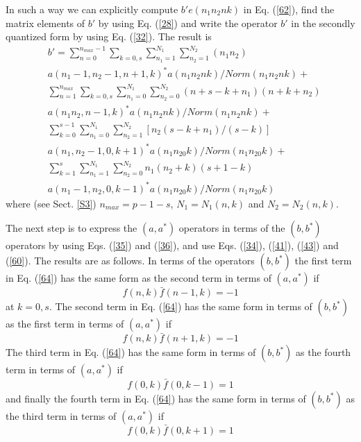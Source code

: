 \documentclass[a4paper,12pt]{article}%
\begin{document}
In such a way we can 
explicitly compute $b'e(n_1n_2nk)$ in Eq. (\ref{62}),
find the matrix elements of $b'$ by using Eq. (\ref{28})
and write the operator $b'$ in the secondly quantized form
by using Eq. (\ref{32}). The result is
\begin{eqnarray}
&b'=\sum_{n=0}^{n_{max}-1}\sum_{k=0,s}\sum_{n_1=1}^{N_1}
\sum_{n_2=1}^{N_2}(n_1n_2)\nonumber\\
&a(n_1-1,n_2-1,n+1,k)^*a(n_1n_2nk)/Norm(n_1n_2nk)+\nonumber\\
&\sum_{n=1}^{n_{max}}\sum_{k=0,s}\sum_{n_1=0}^{N_1}
\sum_{n_2=0}^{N_2}(n+s-k+n_1)(n+k+n_2)\nonumber\\
&a(n_1n_2,n-1,k)^*a(n_1n_2nk)/Norm(n_1n_2nk)+\nonumber\\
&\sum_{k=0}^{s-1}\sum_{n_1=0}^{N_1}
\sum_{n_2=1}^{N_2}[n_2(s-k+n_1)/(s-k)]\nonumber\\
&a(n_1,n_2-1,0,k+1)^*a(n_1n_20k)/Norm(n_1n_20k)+\nonumber\\
&\sum_{k=1}^{s}\sum_{n_1=1}^{N_1}
\sum_{n_2=0}^{N_2}n_1(n_2+k)(s+1-k)\nonumber\\
&a(n_1-1,n_2,0,k-1)^*a(n_1n_20k)/Norm(n_1n_20k)
\label{64}
\end{eqnarray}
where (see Sect. \ref{S3}) $n_{max}=p-1-s$, $N_1=N_1(n,k)$ 
and $N_2=N_2(n,k)$.

The next step is to express the $(a,a^*)$ operators in terms
of the $(b,b^*)$ operators by using Eqs. (\ref{35}) and 
(\ref{36}), and use Eqs. (\ref{34}), (\ref{41}), (\ref{43})
and (\ref{60}). The results are as follows. In terms of the
operators $(b,b^*)$ the first term in Eq. (\ref{64}) has the
same form as the second term in terms of $(a,a^*)$ if
\begin{equation}
f(n,k){\bar f}(n-1,k)=-1
\label{65}
\end{equation}
at $k=0,s$. The second term in Eq. (\ref{64}) has the same 
form in terms of $(b,b^*)$ as the first term in terms of 
$(a,a^*)$ if 
\begin{equation}
f(n,k){\bar f}(n+1,k)=-1
\label{66}
\end{equation}
The third term in Eq. (\ref{64}) has the same 
form in terms of $(b,b^*)$ as the fourth term in terms of 
$(a,a^*)$ if 
\begin{equation}
f(0,k){\bar f}(0,k-1)=1
\label{67}
\end{equation}
and finally the fourth term in Eq. (\ref{64}) has the same 
form in terms of $(b,b^*)$ as the third term in terms of 
$(a,a^*)$ if 
\begin{equation}
f(0,k){\bar f}(0,k+1)=1
\label{68}
\end{equation}
\end{document}
